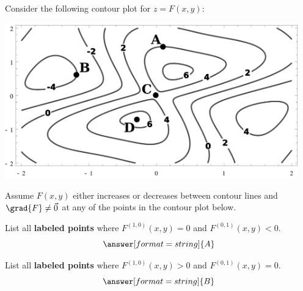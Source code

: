 \documentclass{ximera}
\author{Bart Snapp}
\begin{document}
\begin{exercise}
Consider the following contour plot for $z=F(x,y)$:
\begin{image}
\includegraphics[width=5in]{contours2.png}
\end{image}
Assume $F(x,y)$ either increases or decreases between contour lines and $\grad{F} \neq \vec{0}$ at any of the points in the contour plot below.

List all \textbf{labeled points} where $F^{(1,0)}(x,y) = 0$ and
$F^{(0,1)}(x,y)<0$.
\[
\answer[format=string]{A}
\]

  
List all \textbf{labeled points} where $F^{(1,0)}(x,y) >0$ and
$F^{(0,1)}(x,y)=0$.
\[
\answer[format=string]{B}
\]
\end{exercise}
\end{document}
